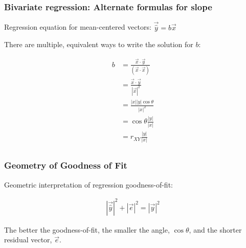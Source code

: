 \documentclass{beamer}
\begin{document}
\begin{frame}[allowframebreaks]
  \frametitle{Bivariate regression: Alternate formulas for slope}

Regression equation for mean-centered vectors: $\vec{\widehat{y}} = b\vec{x}$

There are multiple, equivalent ways to write the solution for $b$:

%
\begin{align*}
b &= \frac{\vec{x} \cdot \vec{y}}{(\vec{x} \cdot \vec{x})} \\
  &= \frac{\vec{x} \cdot \vec{y}}{|\vec{x}|^2}    \\
  &= \frac{|x||y| \cos \theta}{|x|^2} \\
  &= \cos \theta \frac{|y|}{|x|} \\
  &= r_{XY} \frac{|y|}{|x|} \\
\end{align*}


\end{frame}



\begin{frame}
  \frametitle{Geometry of Goodness of Fit}

Geometric interpretation of regression goodness-of-fit:

\begin{center}


\[
\begin{array}{c}
|\vec{\widehat{y}}|^2 + |\vec{e}|^2 = |\vec{y}|^2
\end{array}
\]

\end{center}

The better the goodness-of-fit, the smaller the angle, $\cos \theta$, and the shorter residual vector, $\vec{e}$.



\end{frame}
\end{document}
